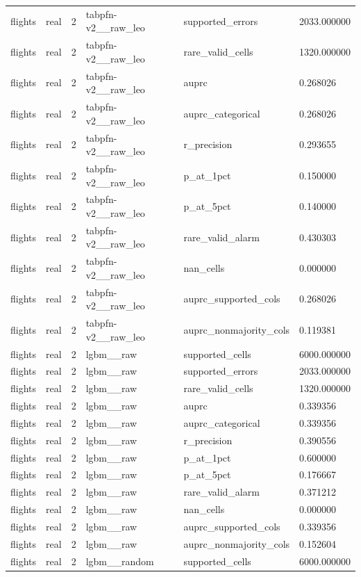\begin{tabular}{llllll}
flights & real & 2 & tabpfn-v2\_\_raw\_leo & supported\_errors & 2033.000000 \\
flights & real & 2 & tabpfn-v2\_\_raw\_leo & rare\_valid\_cells & 1320.000000 \\
flights & real & 2 & tabpfn-v2\_\_raw\_leo & auprc & 0.268026 \\
flights & real & 2 & tabpfn-v2\_\_raw\_leo & auprc\_categorical & 0.268026 \\
flights & real & 2 & tabpfn-v2\_\_raw\_leo & r\_precision & 0.293655 \\
flights & real & 2 & tabpfn-v2\_\_raw\_leo & p\_at\_1pct & 0.150000 \\
flights & real & 2 & tabpfn-v2\_\_raw\_leo & p\_at\_5pct & 0.140000 \\
flights & real & 2 & tabpfn-v2\_\_raw\_leo & rare\_valid\_alarm & 0.430303 \\
flights & real & 2 & tabpfn-v2\_\_raw\_leo & nan\_cells & 0.000000 \\
flights & real & 2 & tabpfn-v2\_\_raw\_leo & auprc\_supported\_cols & 0.268026 \\
flights & real & 2 & tabpfn-v2\_\_raw\_leo & auprc\_nonmajority\_cols & 0.119381 \\
flights & real & 2 & lgbm\_\_raw & supported\_cells & 6000.000000 \\
flights & real & 2 & lgbm\_\_raw & supported\_errors & 2033.000000 \\
flights & real & 2 & lgbm\_\_raw & rare\_valid\_cells & 1320.000000 \\
flights & real & 2 & lgbm\_\_raw & auprc & 0.339356 \\
flights & real & 2 & lgbm\_\_raw & auprc\_categorical & 0.339356 \\
flights & real & 2 & lgbm\_\_raw & r\_precision & 0.390556 \\
flights & real & 2 & lgbm\_\_raw & p\_at\_1pct & 0.600000 \\
flights & real & 2 & lgbm\_\_raw & p\_at\_5pct & 0.176667 \\
flights & real & 2 & lgbm\_\_raw & rare\_valid\_alarm & 0.371212 \\
flights & real & 2 & lgbm\_\_raw & nan\_cells & 0.000000 \\
flights & real & 2 & lgbm\_\_raw & auprc\_supported\_cols & 0.339356 \\
flights & real & 2 & lgbm\_\_raw & auprc\_nonmajority\_cols & 0.152604 \\
flights & real & 2 & lgbm\_\_random & supported\_cells & 6000.000000 \\

\end{tabular}
